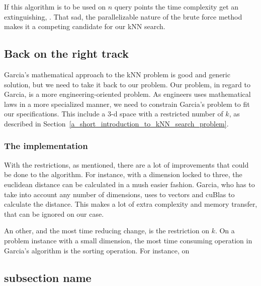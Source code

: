 If this algorithm is to be used on $n$ query points the time complexity get an extinguishing, . That sad, the parallelizable nature of the brute force method makes it a competing candidate for our kNN search.


\subsection{Back on the right track} %
\label{sub:back_on_the_right_rrack}


Garcia's mathematical approach to the kNN problem is good and generic solution, but we need to take it back to our problem. Our problem, in regard to Garcia, is a more engineering-oriented problem. As engineers uses mathematical laws in a more specialized manner, we need to constrain Garcia's problem to fit our specifications. This include a 3-d space with a restricted number of $k$, as described in Section~\ref{a_short_introduction_to_kNN_search_problem}.


\subsubsection{The implementation} %
\label{ssub:the_implementation}


 With the restrictions, as mentioned, there are a lot of improvements that could be done to the algorithm. For instance, with a dimension locked to three, the euclidean distance can be calculated in a mush easier fashion. Garcia, who has to take into account any number of dimensions, uses to vectors and cuBlas to calculate the distance. This makes a lot of extra complexity and memory transfer, that can be ignored on our case.

 An other, and the most time reducing change, is the restriction on $k$. On a problem instance with a small dimension, the most time consuming operation in Garcia's algorithm is the sorting operation. For instance, on 





\subsection{subsection name} %
\label{sub:subsection_name}

